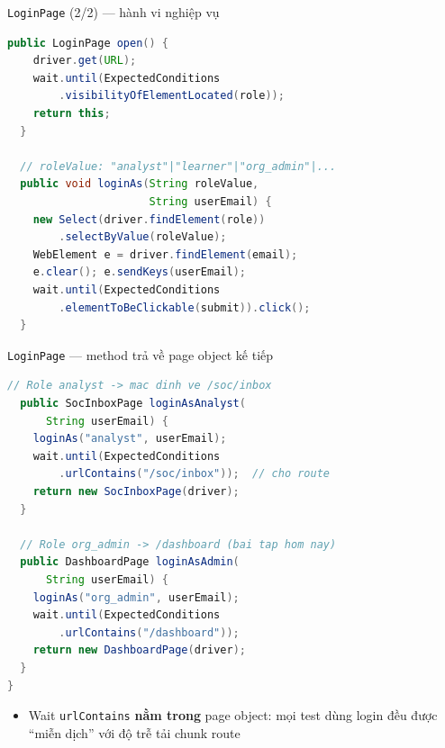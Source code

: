 \documentclass[aspectratio=169,12pt]{beamer}
\begin{document}
\begin{frame}[fragile]{\texttt{LoginPage} (2/2) --- hành vi nghiệp vụ}
\begin{lstlisting}[language=Java,basicstyle=\ttfamily\scriptsize]
  public LoginPage open() {
    driver.get(URL);
    wait.until(ExpectedConditions
        .visibilityOfElementLocated(role));
    return this;
  }

  // roleValue: "analyst"|"learner"|"org_admin"|...
  public void loginAs(String roleValue,
                      String userEmail) {
    new Select(driver.findElement(role))
        .selectByValue(roleValue);
    WebElement e = driver.findElement(email);
    e.clear(); e.sendKeys(userEmail);
    wait.until(ExpectedConditions
        .elementToBeClickable(submit)).click();
  }
\end{lstlisting}
\end{frame}

\begin{frame}[fragile]{\texttt{LoginPage} --- method trả về page object kế tiếp}
\begin{lstlisting}[language=Java,basicstyle=\ttfamily\scriptsize]
  // Role analyst -> mac dinh ve /soc/inbox
  public SocInboxPage loginAsAnalyst(
      String userEmail) {
    loginAs("analyst", userEmail);
    wait.until(ExpectedConditions
        .urlContains("/soc/inbox"));  // cho route
    return new SocInboxPage(driver);
  }

  // Role org_admin -> /dashboard (bai tap hom nay)
  public DashboardPage loginAsAdmin(
      String userEmail) {
    loginAs("org_admin", userEmail);
    wait.until(ExpectedConditions
        .urlContains("/dashboard"));
    return new DashboardPage(driver);
  }
}
\end{lstlisting}

  \begin{itemize}
    \item Wait \texttt{urlContains} \textbf{nằm trong} page object:
          mọi test dùng login đều được ``miễn dịch'' với
          độ trễ tải chunk route
  \end{itemize}
\end{frame}
\end{document}
